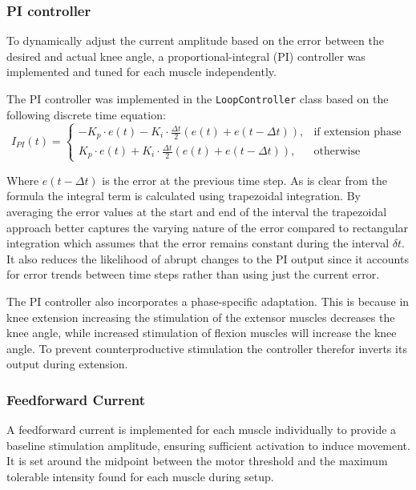 \subsubsection{PI controller}
To dynamically adjust the current amplitude based on the error between the desired and actual knee angle, a proportional-integral (PI) controller was implemented and tuned for each muscle independently. 

The PI controller was implemented in the \texttt{LoopController} class based on the following discrete time equation:
\begin{equation}
I_{PI}(t) = 
\begin{cases} 
-K_p \cdot e(t) - K_i \cdot \frac{\Delta t}{2} \left(e(t) + e(t-\Delta t)\right), & \text{if extension phase} \\
K_p \cdot e(t) + K_i \cdot \frac{\Delta t}{2} \left(e(t) + e(t-\Delta t)\right), & \text{otherwise}
\end{cases}
\end{equation}

Where \( e(t-\Delta t) \) is the error at the previous time step. As is clear from the formula the integral term is calculated using trapezoidal integration. By averaging the error values at the start and end of the interval the trapezoidal approach better captures the varying nature of the error compared to rectangular integration which assumes that the error remains constant during the interval \(\delta t\). It also reduces the likelihood of abrupt changes to the PI output since it accounts for error trends between time steps rather than using just the current error.

The PI controller also incorporates a phase-specific adaptation. This is because in knee extension increasing the stimulation of the extensor muscles decreases the knee angle, while increased stimulation of flexion muscles will increase the knee angle. To prevent counterproductive stimulation the controller therefor inverts its output during extension.

\subsubsection{Feedforward Current}
A feedforward current is implemented for each muscle individually to provide a baseline stimulation amplitude, ensuring sufficient activation to induce movement. It is set around the midpoint between the motor threshold and the maximum tolerable intensity found for each muscle during setup. 


